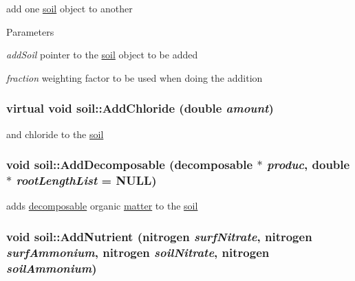 add one \hyperlink{classsoil}{soil} object to another 
\begin{DoxyParams}{Parameters}
\item[{\em addSoil}]pointer to the \hyperlink{classsoil}{soil} object to be added \item[{\em fraction}]weighting factor to be used when doing the addition \end{DoxyParams}
\hypertarget{classsoil_a557304fe67eb65871ce2c751faec1f2e}{
\subsubsection[{AddChloride}]{\setlength{\rightskip}{0pt plus 5cm}virtual void soil::AddChloride (double {\em amount})}}
\label{classsoil_a557304fe67eb65871ce2c751faec1f2e}


and chloride to the \hyperlink{classsoil}{soil} \hypertarget{classsoil_a6ddfca2c474855d16889d6a85c4b508e}{
\subsubsection[{AddDecomposable}]{\setlength{\rightskip}{0pt plus 5cm}void soil::AddDecomposable ({\bf decomposable} $\ast$ {\em produc}, \/  double $\ast$ {\em rootLengthList} = {\ttfamily NULL})}}
\label{classsoil_a6ddfca2c474855d16889d6a85c4b508e}


adds \hyperlink{classdecomposable}{decomposable} organic \hyperlink{classmatter}{matter} to the \hyperlink{classsoil}{soil} \hypertarget{classsoil_a827be6e854fe4893b5856774abb0bc8f}{
\subsubsection[{AddNutrient}]{\setlength{\rightskip}{0pt plus 5cm}void soil::AddNutrient ({\bf nitrogen} {\em surfNitrate}, \/  {\bf nitrogen} {\em surfAmmonium}, \/  {\bf nitrogen} {\em soilNitrate}, \/  {\bf nitrogen} {\em soilAmmonium})}}
\label{classsoil_a827be6e854fe4893b5856774abb0bc8f}


